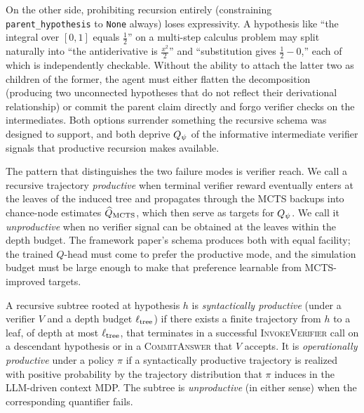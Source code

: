 On the other side, prohibiting recursion entirely (constraining
\texttt{parent\_hypothesis} to \texttt{None} always) loses expressivity.
A hypothesis like ``the integral over $[0, 1]$ equals $\tfrac{1}{2}$''
on a multi-step calculus problem may split naturally into ``the
antiderivative is $\tfrac{x^2}{2}$'' and ``substitution gives
$\tfrac{1}{2} - 0$,'' each of which is independently checkable. Without
the ability to attach the latter two as children of the former, the
agent must either flatten the decomposition (producing two unconnected
hypotheses that do not reflect their derivational relationship) or
commit the parent claim directly and forgo verifier checks on the
intermediates. Both options surrender something the recursive schema
was designed to support, and both deprive $Q_{\psi}$ of the informative
intermediate verifier signals that productive recursion makes
available.

The pattern that distinguishes the two failure modes is verifier reach.
We call a recursive trajectory \emph{productive} when terminal verifier
reward eventually enters at the leaves of the induced tree and
propagates through the MCTS backups into chance-node estimates
$\widehat{Q}_{\mathrm{MCTS}}$, which then serve as targets for $Q_{\psi}$. We call it
\emph{unproductive} when no verifier signal can be obtained at the
leaves within the depth budget. The framework paper's schema produces
both with equal facility; the trained $Q$-head must come to prefer the
productive mode, and the simulation budget must be large enough to
make that preference learnable from MCTS-improved targets.

\begin{definition}
\label{def:productive}
A recursive subtree rooted at hypothesis $h$ is \emph{syntactically
productive} (under a verifier $V$ and a depth budget $\ell_{\mathrm{tree}}$) if
there exists a finite trajectory from $h$ to a leaf, of depth at most
$\ell_{\mathrm{tree}}$, that terminates in a successful \textsc{InvokeVerifier}
call on a descendant hypothesis or in a \textsc{CommitAnswer} that
$V$ accepts. It is \emph{operationally productive} under a policy
$\pi$ if a syntactically productive trajectory is realized with
positive probability by the trajectory distribution that $\pi$
induces in the LLM-driven context MDP. The subtree is
\emph{unproductive} (in either sense) when the corresponding
quantifier fails.
\end{definition}

